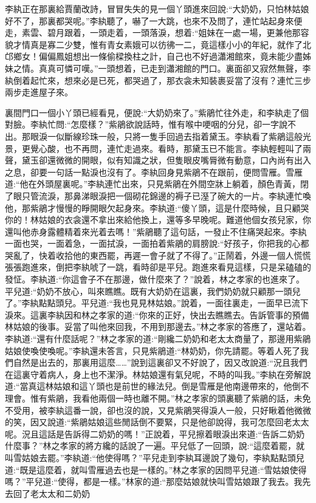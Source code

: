 \begin{parag}
    李紈正在那裏給賈蘭改詩，冒冒失失的見一個丫頭進來回說:“大奶奶，只怕林姑娘好不了，那裏都哭呢。”李紈聽了，嚇了一大跳，也來不及問了，連忙站起身來便走，素雲、碧月跟着，一頭走着，一頭落淚，想着:“姐妹在一處一場，更兼他那容貌才情真是寡二少雙，惟有青女素娥可以彷彿一二，竟這樣小小的年紀，就作了北邙鄉女！偏偏鳳姐想出一條偷樑換柱之計，自己也不好過瀟湘館來，竟未能少盡姊妹之情。真真可憐可嘆。”一頭想着，已走到瀟湘館的門口。裏面卻又寂然無聲，李紈倒着起忙來，想來必是已死，都哭過了，那衣衾未知裝裹妥當了沒有？連忙三步兩步走進屋子來。
\end{parag}


\begin{parag}
    裏間門口一個小丫頭已經看見，便說:“大奶奶來了。”紫鵑忙往外走，和李紈走了個對臉。李紈忙問:“怎麼樣？”紫鵑欲說話時，惟有喉中哽咽的分兒，卻一字說不出。那眼淚一似斷線珍珠一般，只將一隻手回過去指着黛玉。李紈看了紫鵑這般光景，更覺心酸，也不再問，連忙走過來。看時，那黛玉已不能言。李紈輕輕叫了兩聲，黛玉卻還微微的開眼，似有知識之狀，但隻眼皮嘴脣微有動意，口內尚有出入之息，卻要一句話一點淚也沒有了。李紈回身見紫鵑不在跟前，便問雪雁。雪雁道:“他在外頭屋裏呢。”李紈連忙出來，只見紫鵑在外間空牀上躺着，顏色青黃，閉了眼只管流淚，那鼻涕眼淚把一個砌花錦邊的褥子已溼了碗大的一片。李紈連忙喚他，那紫鵑才慢慢的睜開眼欠起身來。李紈道:“傻丫頭，這是什麼時候，且只顧哭你的！林姑娘的衣衾還不拿出來給他換上，還等多早晚呢。難道他個女孩兒家，你還叫他赤身露體精着來光着去嗎！”紫鵑聽了這句話，一發止不住痛哭起來。李紈一面也哭，一面着急，一面拭淚，一面拍着紫鵑的肩膀說:“好孩子，你把我的心都哭亂了，快着收拾他的東西罷，再遲一會子就了不得了。”正鬧着，外邊一個人慌慌張張跑進來，倒把李紈唬了一跳，看時卻是平兒。跑進來看見這樣，只是呆磕磕的發怔。李紈道:“你這會子不在那邊，做什麼來了？”說着，林之孝家的也進來了。平兒道:“奶奶不放心，叫來瞧瞧。既有大奶奶在這裏，我們奶奶就只顧那一頭兒了。”李紈點點頭兒。平兒道:“我也見見林姑娘。”說着，一面往裏走，一面早已流下淚來。這裏李紈因和林之孝家的道:“你來的正好，快出去瞧瞧去。告訴管事的預備林姑娘的後事。妥當了叫他來回我，不用到那邊去。”林之孝家的答應了，還站着。李紈道:“還有什麼話呢？”林之孝家的道:“剛纔二奶奶和老太太商量了，那邊用紫鵑姑娘使喚使喚呢。”李紈還未答言，只見紫鵑道:“林奶奶，你先請罷。等着人死了我們自然是出去的，那裏用這麼……”說到這裏卻又不好說了，因又改說道:“況且我們在這裏守着病人，身上也不潔淨。林姑娘還有氣兒呢，不時的叫我。”李紈在旁解說道:“當真這林姑娘和這丫頭也是前世的緣法兒。倒是雪雁是他南邊帶來的，他倒不理會。惟有紫鵑，我看他兩個一時也離不開。”林之孝家的頭裏聽了紫鵑的話，未免不受用，被李紈這番一說，卻也沒的說，又見紫鵑哭得淚人一般，只好瞅着他微微的笑，因又說道:“紫鵑姑娘這些閒話倒不要緊，只是他卻說得，我可怎麼回老太太呢。況且這話是告訴得二奶奶的嗎！”正說着，平兒擦着眼淚出來道:“告訴二奶奶什麼事？”林之孝家的將方纔的話說了一遍。平兒低了一回頭，說:“這麼着罷，就叫雪姑娘去罷。”李紈道:“他使得嗎？”平兒走到李紈耳邊說了幾句，李紈點點頭兒道:“既是這麼着，就叫雪雁過去也是一樣的。”林之孝家的因問平兒道:“雪姑娘使得嗎？”平兒道:“使得，都是一樣。”林家的道:“那麼姑娘就快叫雪姑娘跟了我去。我先去回了老太太和二奶奶
\end{parag}
